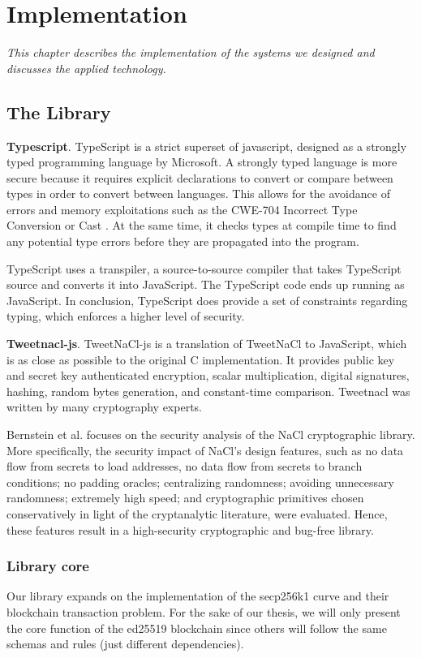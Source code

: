\chapter{Implementation} \label{chap:System_implementation}
\textit{This chapter describes the implementation of the systems we designed and discusses the applied technology.}

\minitoc

\section{The Library}
\bigskip
{\textbf{Typescript}}. TypeScript is a strict superset of javascript, designed as a strongly typed programming language by Microsoft. A strongly typed language is more secure because it requires explicit declarations to convert or compare between types in order to convert between languages. This allows for the avoidance of errors and memory exploitations such as the CWE-704 Incorrect Type Conversion or Cast \cite{cwe}. At the same time, it checks types at compile time to find any potential type errors before they are propagated into the program.

TypeScript uses a transpiler, a source-to-source compiler that takes TypeScript source and converts it into JavaScript. The TypeScript code ends up running as JavaScript. In conclusion, TypeScript does provide a set of constraints regarding typing, which enforces a higher level of security.

\bigskip
{\textbf{Tweetnacl-js}}. TweetNaCl-js is a translation of TweetNaCl to JavaScript, which is as close as possible to the original C implementation. It provides public key and secret key authenticated encryption, scalar multiplication, digital signatures, hashing, random bytes generation, and constant-time comparison. Tweetnacl was written by many cryptography experts.

Bernstein et al. \cite{Bernstein2012} focuses on the security analysis of the NaCl cryptographic library.
More specifically, the security impact of NaCl's design features, such as no data flow
from secrets to load addresses, no data flow from secrets to branch conditions; no padding oracles; centralizing randomness; avoiding unnecessary randomness; extremely high speed; and cryptographic primitives chosen conservatively in light of the cryptanalytic literature, were evaluated. Hence, these features result in a high-security cryptographic and bug-free library.

\subsection{Library core}
Our library expands on the implementation of the secp256k1 curve and their blockchain transaction problem. For the sake of our thesis, we will only present the core function of the ed25519 blockchain since others will follow the same schemas and rules (just different dependencies).

